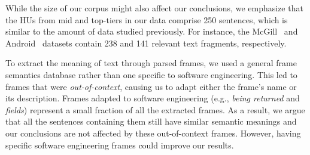 While the size of our corpus might also affect our conclusions,
we emphasize that the HUs from mid and top-tiers in our data comprise 250 sentences, 
which is similar to the amount of data studied previously. For instance, the McGill~\cite{Petrosyan2015}
and Android~\cite{Jiang2016b} datasets contain 238 and 141 relevant text fragments, respectively.


To extract the meaning of text through parsed frames, 
we used a general frame semantics database rather than one
specific to software engineering.  This led to frames that were
\textit{out-of-context}, causing us to adapt either the frame's
name or its description.  
Frames adapted to software engineering (e.g., \textit{being returned}
and \textit{fields}) represent a small fraction of all the extracted
frames. As a result, we argue that all the sentences containing them still have
similar semantic meanings and our conclusions are not
affected by these out-of-context frames. However, having specific
software engineering frames could improve our results.
